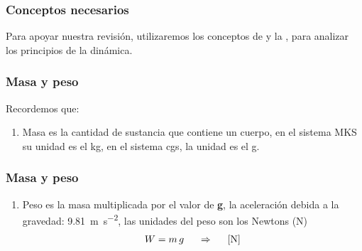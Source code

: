 \documentclass[14pt]{beamer}
\begin{document}
\begin{frame}
\frametitle{Conceptos necesarios}
Para apoyar nuestra revisión, utilizaremos los conceptos de  y la , para analizar los principios de la dinámica.
\end{frame}
\begin{frame}
\frametitle{Masa y peso}
Recordemos que:
\begin{enumerate}[<+->]
\item Masa es la cantidad de sustancia que contiene un cuerpo, \pause en el sistema MKS su unidad es el \si{\kilo\gram}, \pause en el sistema cgs, la unidad es el \si{\gram}.
\seti
\end{enumerate}
\end{frame}
\begin{frame}
\frametitle{Masa y peso}
\begin{enumerate}[<+->]
\conti
\item Peso es la masa multiplicada por el valor de \textbf{g}, \pause la aceleración debida a la gravedad: \SI{9.81}{\meter\per\square\second}, \pause las unidades del peso son los Newtons (\si{\newton})
\pause
\begin{align*}
W = m \, g \hspace{0.5cm} \Rightarrow \hspace{0.5cm} \left[ \si{\newton} \right]
\end{align*}
\end{enumerate}
\end{frame}    
\end{document}

